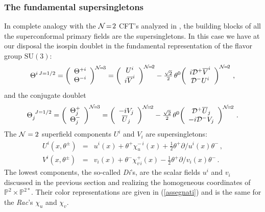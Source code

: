 \documentclass[a4paper,12pt]{article}
\newcommand{\ft}[2]{{\textstyle\frac{#1}{#2}}}
\begin{document}
\subsubsection{The fundamental supersingletons}
In complete analogy with the ${\cal N}\!=\!2$ CFT's analyzed
in \cite{3dcft}, the building blocks of all the superconformal
primary fields are the supersingletons.
In this case we have at our disposal the isospin doublet in the
fundamental representation of the flavor group $\mathrm{SU(3)}$:
\begin{equation}\label{N=3supersingleton}
\Theta^{i\,J=1/2}=\left(\begin{array}{c}
\Theta^{+i}\\
\Theta^{-i}
\end{array}\right)^{{\cal N}\!=\!3}=
\left(\begin{array}{c}
U^i\\
i\overline V^i
\end{array}\right)^{{\cal N}\!=\!2}-\ft{\sqrt 2}{2}\,
\theta^0\!\left(\begin{array}{c}
i{\cal D}^+\overline V^i\\
{\cal D}^- U^i
\end{array}\right)^{{\cal N}\!=\!2}\,,\label{N=3doublet}
\end{equation}
and the conjugate doublet
\begin{equation}
\Theta_j^{\ J=1/2}=\left(\begin{array}{c}
\Theta^+_j\\
\Theta^-_j
\end{array}\right)^{{\cal N}\!=\!3}=
\left(\begin{array}{c}
-iV_j\\
\overline U_j
\end{array}\right)^{{\cal N}\!=\!2}-\ft{\sqrt 2}{2}\,
\theta^0\!\left(\begin{array}{c}
{\cal D}^+\overline U_j\\
-i{\cal D}^- V_j
\end{array}\right)^{{\cal N}\!=\!2}\,.\label{N=3conjugate}
\end{equation}
The ${\cal N}=2$ superfield components $U^i$ and $V_i$ are
supersingletons:
\begin{eqnarray}
  U^i(x,\theta^\pm) &=& u^i(x) + \theta^+\chi^{-\,i}_u(x)
  + \ft{1}{2}\theta^+\partial\!\!\!/u^i(x)\theta^-\,,\nonumber\\
  V^i(x,\theta^\pm) &=& v_i(x) + \theta^-\chi^+_{v\,i}(x)
  - \ft{1}{2}\theta^+\partial\!\!\!/v_i(x)\theta^-\,.
\label{defiuvi}
\end{eqnarray}
The lowest components, the so-called {\it Di}'s, are the scalar
fields $u^i$ and $v_i$ discussed in the previous section
and realizing the homogeneous coordinates of
$\mathbb{P}^2 \times \mathbb{P}^{2*}$.
Their color representations are given in (\ref{assegnati}) and
is the same for the {\it Rac}'s $\chi_u$ and $\chi_v$.
\end{document}
